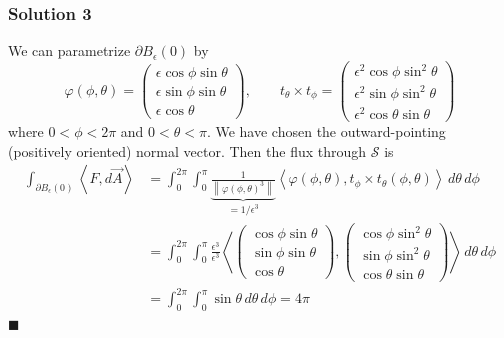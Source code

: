 \documentclass[10pt, t, allowdisplaybreaks]{beamer}
\newcommand{\myqed}{\hfill$\blacksquare$}
\begin{document}
\begin{frame}
    \frametitle{Solution 3}
    \par  We can parametrize $\partial B_\epsilon(0)$ by 
    \begin{equation*}
        \varphi(\phi, \theta) = \begin{pmatrix}
            \epsilon \cos \phi \sin \theta\\
            \epsilon \sin\phi \sin\theta\\
            \epsilon\cos\theta
        \end{pmatrix}, \qquad
        t_\theta\times t_\phi = \begin{pmatrix}
            \epsilon^2\cos\phi\sin^2\theta\\
            \epsilon^2\sin\phi\sin^2\theta\\
            \epsilon^2\cos\theta\sin\theta
        \end{pmatrix}
    \end{equation*}
    where $0<\phi<2\pi$ and $0<\theta<\pi$. We have chosen the outward-pointing (positively oriented) normal vector. Then the flux through $\mathcal{S}$ is 
    \begin{equation*}
        \begin{split}
            \int_{\partial B_\epsilon(0)}\left\langle F, d\overrightarrow{A} \right\rangle 
            &= \int^{2\pi}_0\int^\pi_0\underbrace{\frac{1}{\left\lVert \varphi(\phi,\theta)^3\right\rVert }}_{=1/\epsilon^3}\left\langle \varphi(\phi, \theta), t_\phi\times t_\theta(\phi, \theta)\right\rangle \,d\theta\,d\phi\\
            &= \int^{2\pi}_0\int^\pi_0 \frac{\epsilon^3}{\epsilon^3}\left\langle \begin{pmatrix}
                 \cos \phi \sin \theta\\
                 \sin\phi \sin\theta\\
                \cos\theta
            \end{pmatrix}, \begin{pmatrix}
                \cos\phi\sin^2\theta\\
                \sin\phi\sin^2\theta\\
                \cos\theta\sin\theta
            \end{pmatrix}\right\rangle \,d\theta\,d\phi\\
            &= \int^{2\pi}_0\int^\pi_0\sin\theta\,d\theta\,d\phi = 4\pi
        \end{split}
    \end{equation*}
    \myqed
\end{frame}
\end{document}
